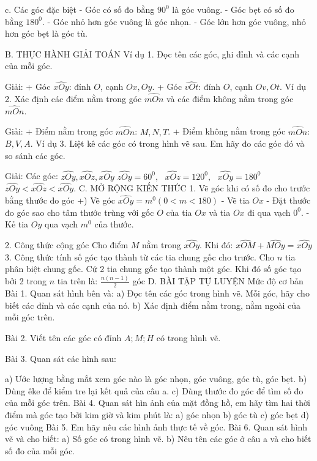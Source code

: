 c. Các góc đặc biệt
- Góc có số đo bằng ${{90}^{0}}$ là góc vuông.
- Góc bẹt có số đo bằng ${{180}^{0}}$.
- Góc nhỏ hơn góc vuông là góc nhọn.
- Góc lớn hơn góc vuông, nhỏ hơn góc bẹt là góc tù.

B. THỰC HÀNH GIẢI TOÁN
Ví dụ 1. Đọc tên các góc, ghi đỉnh và các cạnh của mỗi góc. 

Giải:
+ Góc $\widehat{xOy}$: đỉnh $O$, cạnh $Ox,Oy$.
+ Góc $\widehat{vOt}$: đỉnh $O$, cạnh $Ov,Ot$.
Ví dụ 2. Xác định các điểm nằm trong góc $\widehat{mOn}$ và các điểm không nằm trong góc $\widehat{mOn}$.

Giải:
+ Điểm nằm trong góc $\widehat{mOn}$: $M,N,T$.
+ Điểm không nằm trong góc $\widehat{mOn}$: $B,V,A$.
Ví dụ 3. Liệt kê các góc có trong hình vẽ sau. Em hãy đo các góc đó và so sánh các góc.

Giải: Các góc: $\widehat{zOy},\widehat{xOz},\widehat{xOy}$
$\widehat{zOy}={{60}^{0}},\,\,\,\,\widehat{xOz}={{120}^{0}},\,\,\,\,\widehat{xOy}={{180}^{0}}$
$\widehat{zOy}<\widehat{xOz}<\widehat{xOy}$.
C. MỞ RỘNG KIẾN THỨC
1. Vẽ góc khi có số đo cho trước bằng thước đo góc
+) Vẽ góc $\widehat{xOy}={{m}^{0}}\left( 0<m<180 \right)$
- Vẽ tia $Ox$
- Đặt thước đo góc sao cho tâm thước trùng với gốc $O$ của tia $Ox$ và tia $Ox$ đi qua vạch ${{0}^{0}}$.
- Kẻ tia $Oy$ qua vạch ${{m}^{0}}$ của thước.

2. Công thức cộng góc
Cho điểm $M$ nằm trong $\widehat{xOy}$. Khi đó: $\widehat{xOM}+\widehat{MOy}=\widehat{xOy}$
3. Công thức tính số góc tạo thành từ các tia chung gốc cho trước.
Cho $n$ tia phân biệt chung gốc. Cứ 2 tia chung gốc tạo thành một góc. Khi đó số góc tạo bởi 2 trong $n$ tia trên là: $\frac{n(n-1)}{2}$ góc
D. BÀI TẬP TỰ LUYỆN
Mức độ cơ bản
Bài 1. Quan sát hình bên và: 
a) Đọc tên các góc trong hình vẽ. Mỗi góc, hãy cho biết các đỉnh và các cạnh của nó.
b) Xác định điểm nằm trong, nằm ngoài của mỗi góc trên.

Bài 2. Viết tên các góc có đỉnh $A;M;H$ có trong hình vẽ. 




Bài 3. Quan sát các hình sau:

a) Ước lượng bằng mắt xem góc nào là góc nhọn, góc vuông, góc tù, góc bẹt.
b) Dùng êke để kiểm tre lại kết quả của câu a.
c) Dùng thước đo góc để tìm số đo của mỗi góc trên.
Bài 4. Quan sát hìn ảnh của mặt đồng hồ, em hãy tìm hai thời điểm mà góc tạo bởi kim giờ và kim phút là:
a) góc nhọn	b) góc tù
c) góc bẹt	d) góc vuông
Bài 5. Em hãy nêu các hình ảnh thực tế về góc.
Bài 6. Quan sát hình vẽ và cho biết: 
a) Số góc có trong hình vẽ.
b) Nêu tên các góc ở câu a và cho biết số đo của mỗi góc. 

